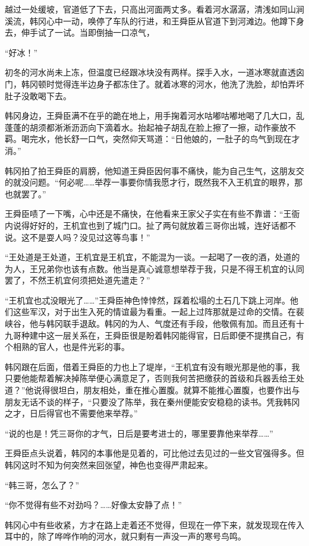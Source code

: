 越过一处缓坡，官道低了下去，只高出河面两丈多。看着河水潺潺，清浅如同山涧溪流，韩冈心中一动，唤停了车队的行进，和王舜臣从官道下到河滩边。他蹲下身去，伸手试了一试。当即倒抽一口凉气，

“好冰！”

初冬的河水尚未上冻，但温度已经跟冰块没有两样。探手入水，一道冰寒就直透囟门，韩冈顿时觉得连半边身子都冻住了。就着冰寒的河水，他洗了洗脸，却怕弄坏肚子没敢喝下去。

韩冈身边，王舜臣满不在乎的跪在地上，用手掬着河水咕嘟咕嘟地喝了几大口，乱蓬蓬的胡须都淅淅沥沥向下滴着水。抬起袖子胡乱在脸上擦了一擦，动作豪放不羁。喝完水，他长舒一口气，突然仰天骂道：“日他娘的，一肚子的鸟气到现在才消。”

韩冈拍了拍王舜臣的肩膀，他知道王舜臣因何事不痛快，能为自己生气，这朋友交的就没问题。“何必呢……举荐一事要你情我愿才行，既然我不入王机宜的眼界，那也就罢了。”

王舜臣啧了一下嘴，心中还是不痛快，在他看来王家父子实在有些不靠谱：“王衙内说得好好的，王机宜也到了城门口。扯了两句就放着三哥你出城，连好话都不说。这不是耍人吗？没见过这等鸟事！”

“王处道是王处道，王机宜是王机宜，不能混为一谈。一起喝了一夜的酒，处道的为人，王兄弟你也该有点数。他当是真心诚意想举荐于我，只是不得王机宜的认同罢了，不然王机宜何须把处道先遣走？”

“王机宜也忒没眼光了……”王舜臣神色悻悻然，踩着松塌的土石几下跳上河岸。他们这些军汉，对于出生入死的情谊最为看重。一起上过阵那就是过命的交情。在裴峡谷，他与韩冈联手退敌。韩冈的为人、气度还有手段，他敬佩有加。而且还有十九哥种建中这一层关系在，王舜臣很是盼着韩冈能得官，日后即便不提携自己，有个相熟的官人，也是件光彩的事。

韩冈跟在后面，借着王舜臣的力也上了堤岸，“王机宜有没有眼光那是他的事，我只要他能帮着解决掉陈举便心满意足了，否则我何苦把缴获的首级和兵器丢给王处道？”他说得很坦白，朋友相处，重在推心置腹。就算不能推心置腹，也要作出与朋友无话不谈的样子，“只要没了陈举，我在秦州便能安安稳稳的读书。凭我韩冈之才，日后得官也不需要他来举荐。”

“说的也是！凭三哥你的才气，日后是要考进士的，哪里要靠他来举荐……”

王舜臣点头说着，韩冈的本事他是见着的，可比他过去见过的一些文官强得多。但韩冈这时不知为何突然来回张望，神色也变得严肃起来。

“韩三哥，怎么了？”

“你不觉得有些不对劲吗？……好像太安静了点！”

韩冈心中有些收紧，方才在路上走着还不觉得，但现在一停下来，就发现现在传入耳中的，除了哗哗作响的河水，就只剩有一声没一声的寒号鸟鸣。

